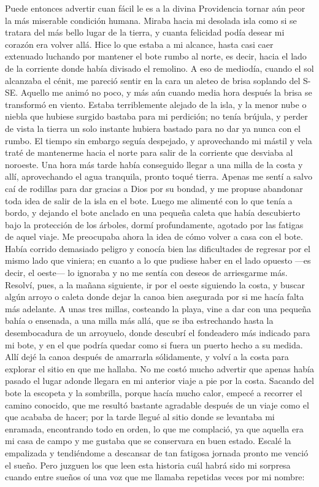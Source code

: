 \documentclass{novela}
\begin{document}
    Puede entonces advertir cuan fácil le es a la divina Providencia tornar aún peor la más miserable condición humana. Miraba hacia mi desolada isla como si se tratara del más bello lugar de la tierra, y cuanta felicidad podía desear mi corazón era volver allá.
    Hice lo que estaba a mi alcance, hasta casi caer extenuado luchando por mantener el bote rumbo al norte, es decir, hacia el lado de la corriente donde había divisado el remolino. A eso de mediodía, cuando el sol alcanzaba el cénit, me pareció sentir en la cara un aleteo de brisa soplando del S-SE. Aquello me animó no poco, y más aún cuando media hora después la brisa se transformó en viento. Estaba terriblemente alejado de la isla, y la menor nube o niebla que hubiese surgido bastaba para mi perdición; no tenía brújula, y perder de vista la tierra un solo instante hubiera bastado para no dar ya nunca con el rumbo.
    El tiempo sin embargo seguía despejado, y aprovechando mi mástil y vela traté de mantenerme hacia el norte para salir de la corriente que desviaba al noroeste. Una hora más tarde había conseguido llegar a una milla de la costa y allí, aprovechando el agua tranquila, pronto toqué tierra.
    Apenas me sentí a salvo caí de rodillas para dar gracias a Dios por su bondad, y me propuse abandonar toda idea de salir de la isla en el bote. Luego me alimenté con lo que tenía a bordo, y dejando el bote anclado en una pequeña caleta que había descubierto bajo la protección de los árboles, dormí profundamente, agotado por las fatigas de aquel viaje.
    Me preocupaba ahora la idea de cómo volver a casa con el bote. Había corrido demasiado peligro y conocía bien las dificultades de regresar por el mismo lado que viniera; en cuanto a lo que pudiese haber en el lado opuesto —es decir, el oeste— lo ignoraba y no me sentía con deseos de arriesgarme más. Resolví, pues, a la mañana siguiente, ir por el oeste siguiendo la costa, y buscar algún arroyo o caleta donde dejar la canoa bien asegurada por si me hacía falta más adelante. A unas tres millas, costeando la playa, vine a dar con una pequeña bahía o ensenada, a una milla más allá, que se iba estrechando hasta la desembocadura de un arroyuelo, donde descubrí el fondeadero más indicado para mi bote, y en el que podría quedar como si fuera un puerto hecho a su medida. Allí dejé la canoa después de amarrarla sólidamente, y volví a la costa para explorar el sitio en que me hallaba.
    No me costó mucho advertir que apenas había pasado el lugar adonde llegara en mi anterior viaje a pie por la costa. Sacando del bote la escopeta y la sombrilla, porque hacía mucho calor, empecé a recorrer el camino conocido, que me resultó bastante agradable después de un viaje como el que acababa de hacer; por la tarde llegué al sitio donde se levantaba mi enramada, encontrando todo en orden, lo que me complació, ya que aquella era mi casa de campo y me gustaba que se conservara en buen estado. Escalé la empalizada y tendiéndome a descansar de tan fatigosa jornada pronto me venció el sueño. Pero juzguen los que leen esta historia cuál habrá sido mi sorpresa cuando entre sueños oí una voz que me llamaba repetidas veces por mi nombre:
\end{document}

